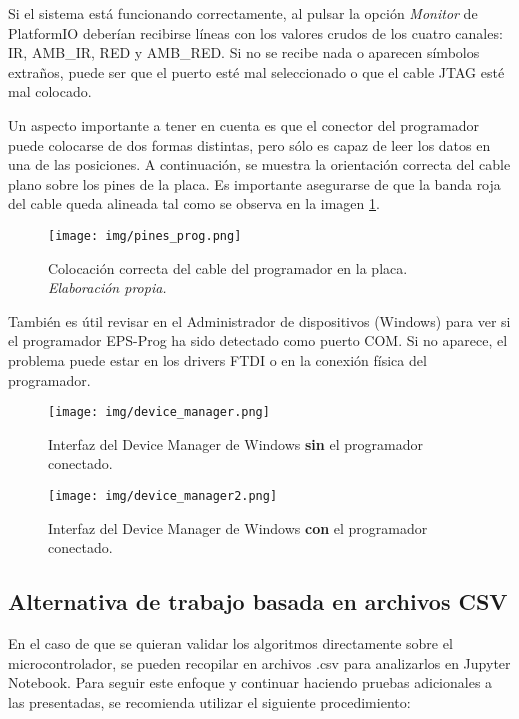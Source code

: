 Si el sistema está funcionando correctamente, al pulsar la opción \textit{Monitor} de PlatformIO deberían recibirse líneas con los valores crudos de los cuatro canales: IR, AMB\_IR, RED y AMB\_RED. Si no se recibe nada o aparecen símbolos extraños, puede ser que el puerto esté mal seleccionado o que el cable JTAG esté mal colocado.

Un aspecto importante a tener en cuenta es que el conector del programador puede colocarse de dos formas distintas, pero sólo es capaz de leer los datos en una de las posiciones. A continuación, se muestra la orientación correcta del cable plano sobre los pines de la placa. Es importante asegurarse de que la banda roja del cable queda alineada tal como se observa en la imagen \ref{fig: pines_prog}.

    \begin{figure}[H]
    \centering
    \texttt{[image: img/pines\_prog.png]}
    \caption{Colocación correcta del cable del programador en la placa. \textit{Elaboración propia.}}
    \label{fig: pines_prog}
    \end{figure}

También es útil revisar en el Administrador de dispositivos (Windows) para ver si el programador EPS-Prog ha sido detectado como puerto COM. Si no aparece, el problema puede estar en los drivers FTDI o en la conexión física del programador.

\begin{figure}[H]
  \centering
  \texttt{[image: img/device\_manager.png]}
  \caption{Interfaz del Device Manager de Windows \textbf{sin} el programador conectado.}
  \label{fig:device_manager}
\end{figure}

\begin{figure}[H]
  \centering
  \texttt{[image: img/device\_manager2.png]}
  \caption{Interfaz del Device Manager de Windows \textbf{con} el programador conectado.}
  \label{fig:device_manager2}
\end{figure}


\subsection{Alternativa de trabajo basada en archivos CSV}

En el caso de que se quieran validar los algoritmos directamente sobre el microcontrolador, se pueden recopilar en archivos .csv para analizarlos en Jupyter Notebook. Para seguir este enfoque y continuar haciendo pruebas adicionales a las presentadas, se recomienda utilizar el siguiente procedimiento:


